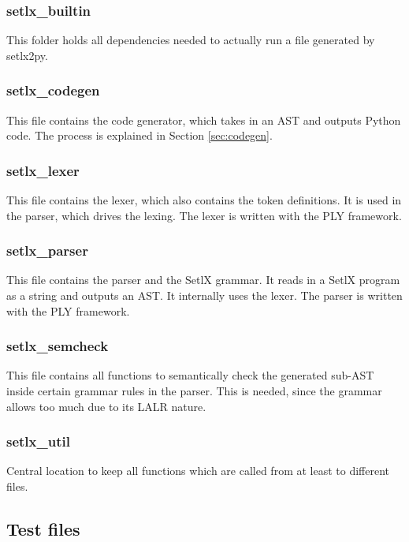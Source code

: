 %
\subsubsection{setlx\_builtin}
This folder holds all dependencies needed to actually run a file generated by setlx2py.

%
\subsubsection{setlx\_codegen}

This file contains the code generator, which takes in an AST and outputs Python code. The process is explained in Section \ref{sec:codegen}.

%
\subsubsection{setlx\_lexer}

This file contains the lexer, which also contains the token definitions. It is used in the parser, which drives the lexing. The lexer is written with the PLY framework.

%
\subsubsection{setlx\_parser}

This file contains the parser and the SetlX grammar. It reads in a SetlX program as a string and outputs an AST. It internally uses the lexer. The parser is written with the PLY framework.

%
\subsubsection{setlx\_semcheck}

This file contains all functions to semantically check the generated sub-AST inside certain grammar rules in the parser. This is needed, since the grammar allows too much due to its LALR nature.

%
\subsubsection{setlx\_util}

Central location to keep all functions which are called from at least to different files.

%
%
\clearpage
\subsection{Test files}

